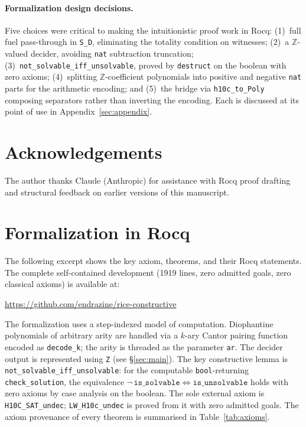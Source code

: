 \documentclass{lmcs}
\begin{document}
\paragraph*{Formalization design decisions.}
Five choices were critical to making the intuitionistic proof work in
Rocq: (1)~full fuel pass-through in \texttt{S\_D}, eliminating the
totality condition on witnesses; (2)~a $\mathbb{Z}$-valued decider,
avoiding \texttt{nat} subtraction truncation; (3)~\texttt{not\_solvable\_iff\_unsolvable},
proved by \texttt{destruct} on the boolean with zero axioms;
(4)~splitting $\mathbb{Z}$-coefficient polynomials into positive and
negative \texttt{nat} parts for the arithmetic encoding; and (5)~the
bridge via \texttt{h10c\_to\_Poly} composing separators rather than
inverting the encoding. Each is discussed at its point of use in
Appendix~\ref{sec:appendix}.

\section*{Acknowledgements}

The author thanks Claude (Anthropic) for assistance with Rocq proof
drafting and structural feedback on earlier versions of this manuscript.

\section{Formalization in Rocq}
\label{app:rocq}

The following excerpt shows the key axiom, theorems, and their Rocq statements.
The complete self-contained development (1919 lines, zero admitted goals, zero
classical axioms) is available at:
\begin{center}
\url{https://github.com/endrazine/rice-constructive}
\end{center}
The formalization uses a step-indexed model of computation. Diophantine polynomials of arbitrary arity are handled via a
$k$-ary Cantor pairing function encoded as \texttt{decode\_k}; the arity
is threaded as the parameter \texttt{ar}. The decider output is represented
using \texttt{Z} (see §\ref{sec:main}). The key constructive lemma is
\texttt{not\_solvable\_iff\_unsolvable}: for the computable
\texttt{bool}-returning \texttt{check\_solution}, the equivalence
$\neg\,\mathtt{is\_solvable} \Leftrightarrow \mathtt{is\_unsolvable}$
holds with zero axioms by case analysis on the boolean.
The sole external axiom is \texttt{H10C\_SAT\_undec};
\texttt{LW\_H10c\_undec} is proved from it with zero admitted goals.
The axiom provenance of every theorem is summarised in Table~\ref{tab:axioms}.
\end{document}
